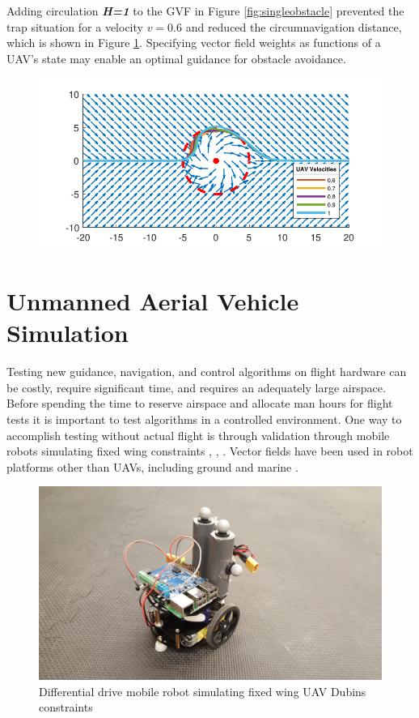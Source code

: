 \documentclass[numbered,pdftex]{ohio-etd}
\begin{document}
Adding circulation \textit{\textbf{H=1}} to the GVF in Figure \ref{fig:singleobstacle} prevented the trap situation for a velocity $v = 0.6$ and reduced the circumnavigation distance, which is shown in Figure \ref{fig:singleobstacleWithCirc}. Specifying vector field weights as functions of a UAV's state may enable an optimal guidance for obstacle avoidance. 

\begin{figure}[h]
	\centering
	\includegraphics[width=12cm]{PaperFigures/singleObstacleWithCirc}
	\caption{}
	\label{fig:singleobstacleWithCirc}
\end{figure}




\pagebreak
\section{Unmanned Aerial Vehicle Simulation}
Testing new guidance, navigation, and control algorithms on flight hardware can be costly, require significant time, and requires an adequately large airspace. Before spending the time to reserve airspace and allocate man hours for flight tests it is important to test algorithms in a controlled environment. One way to accomplish testing without actual flight is through validation through mobile robots simulating fixed wing constraints \cite{ren_experimental_2007}, \cite{louali_designing_2014}, \cite{louali_experimental_2016}. Vector fields have been used in robot platforms other than UAVs, including ground \cite{kapitanyuk_guiding_2017} and marine \cite{schmitt_obstacle_2016}.

\begin{figure}
	\centering
	\includegraphics[width=15cm]{PaperFigures/robot}
	\caption{Differential drive mobile robot simulating fixed wing UAV Dubins constraints}
	\label{fig:robot}
\end{figure}
\end{document}
